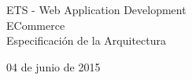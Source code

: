
\begin{titlepage}
\begin{center}


\huge ETS - Web Application Development \\[1.0cm]


\Large ECommerce \\[1.5cm]
\Large Especificación de la Arquitectura \\[1.5cm]

\noindent

\end{center}



\vspace{2.5cm}

\vfill

{\large 04 de junio de 2015}


\end{titlepage}



